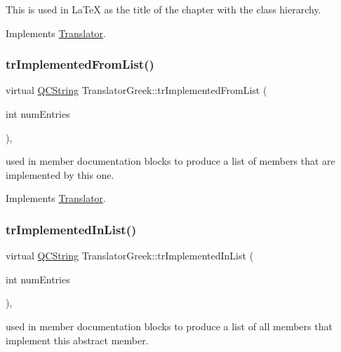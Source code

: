This is used in La\+TeX as the title of the chapter with the class hierarchy. 

Implements \mbox{\hyperlink{class_translator}{Translator}}.

\mbox{\label{class_translator_greek_ad64ceaa558279f1b67804889286beaa5}} 
\subsubsection{\texorpdfstring{trImplementedFromList()}{trImplementedFromList()}}
{\footnotesize\ttfamily virtual \mbox{\hyperlink{class_q_c_string}{Q\+C\+String}} Translator\+Greek\+::tr\+Implemented\+From\+List (\begin{DoxyParamCaption}\item[{int}]{num\+Entries }\end{DoxyParamCaption})\hspace{0.3cm}{\ttfamily [inline]}, {\ttfamily [virtual]}}

used in member documentation blocks to produce a list of members that are implemented by this one. 

Implements \mbox{\hyperlink{class_translator}{Translator}}.

\mbox{\label{class_translator_greek_a8fdacd5a6741161cc42567debd0f59d7}} 
\subsubsection{\texorpdfstring{trImplementedInList()}{trImplementedInList()}}
{\footnotesize\ttfamily virtual \mbox{\hyperlink{class_q_c_string}{Q\+C\+String}} Translator\+Greek\+::tr\+Implemented\+In\+List (\begin{DoxyParamCaption}\item[{int}]{num\+Entries }\end{DoxyParamCaption})\hspace{0.3cm}{\ttfamily [inline]}, {\ttfamily [virtual]}}

used in member documentation blocks to produce a list of all members that implement this abstract member. 

